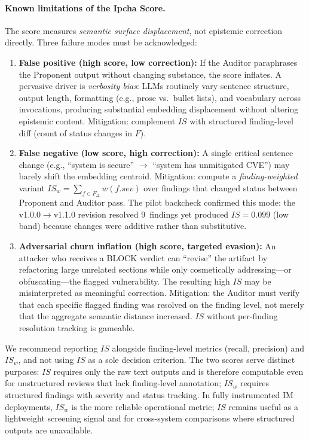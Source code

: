 \documentclass[11pt,a4paper]{article}
\begin{document}
\paragraph{Known limitations of the Ipcha Score.}
\label{sec:score-limits}
The score measures \emph{semantic surface displacement}, not epistemic correction directly.
Three failure modes must be acknowledged:
\begin{enumerate}
  \item \textbf{False positive (high score, low correction):} If the Auditor paraphrases the Proponent output without changing substance, the score inflates.
  A pervasive driver is \emph{verbosity bias}: LLMs routinely vary sentence structure, output length, formatting (e.g., prose vs.\ bullet lists), and vocabulary across invocations, producing substantial embedding displacement without altering epistemic content.
  Mitigation: complement $\mathit{IS}$ with structured finding-level diff (count of status changes in $F$).
  \item \textbf{False negative (low score, high correction):} A single critical sentence change (e.g., ``system is secure'' $\to$ ``system has unmitigated CVE'') may barely shift the embedding centroid. Mitigation: compute a \emph{finding-weighted} variant $\mathit{IS}_w = \sum_{f \in F_{\Delta}} w(f.\mathit{sev})$ over findings that changed status between Proponent and Auditor pass.
  The pilot backcheck confirmed this mode: the v1.0.0$\to$v1.1.0 revision resolved 9~findings yet produced $\mathit{IS} = 0.099$ (low band) because changes were additive rather than substitutive.
  \item \textbf{Adversarial churn inflation (high score, targeted evasion):} An attacker who receives a BLOCK verdict can ``revise'' the artifact by refactoring large unrelated sections while only cosmetically addressing---or obfuscating---the flagged vulnerability. The resulting high $\mathit{IS}$ may be misinterpreted as meaningful correction. Mitigation: the Auditor must verify that each specific flagged finding was resolved on the finding level, not merely that the aggregate semantic distance increased. $\mathit{IS}$ without per-finding resolution tracking is gameable.
\end{enumerate}
We recommend reporting $\mathit{IS}$ alongside finding-level metrics (recall, precision) and $\mathit{IS}_w$, and not using $\mathit{IS}$ as a sole decision criterion.
The two scores serve distinct purposes: $\mathit{IS}$ requires only the raw text outputs and is therefore computable even for unstructured reviews that lack finding-level annotation; $\mathit{IS}_w$ requires structured findings with severity and status tracking.
In fully instrumented IM deployments, $\mathit{IS}_w$ is the more reliable operational metric; $\mathit{IS}$ remains useful as a lightweight screening signal and for cross-system comparisons where structured outputs are unavailable.
\end{document}
